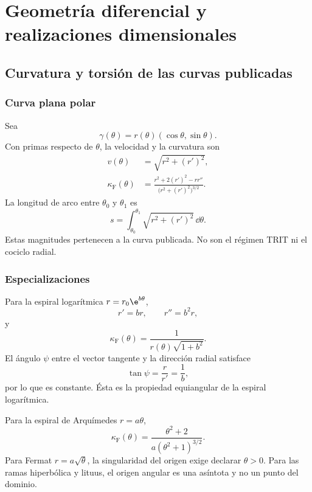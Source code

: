 \part{Geometría diferencial y realizaciones dimensionales}

\chapter{Curvatura y torsión de las curvas publicadas}

\section{Curva plana polar}

Sea
\[
 \gamma(\theta)=r(\theta)(\cos\theta,\sin\theta).
\]
Con primas respecto de \(\theta\), la velocidad y la curvatura son
\begin{align}
 v(\theta)&=\sqrt{r^2+(r')^2},\\
 \kappa_{\mathrm{F}}(\theta)&=
 \frac{r^2+2(r')^2-rr''}
 {\bigl(r^2+(r')^2\bigr)^{3/2}}.
 \label{espiral:eq:curvatura-polar}
\end{align}
La longitud de arco entre \(\theta_0\) y \(\theta_1\) es
\[
 s=\int_{\theta_0}^{\theta_1}
 \sqrt{r^2+(r')^2}\,\dd\theta.
\]
Estas magnitudes pertenecen a la curva publicada. No son el régimen TRIT ni
el cociclo radial.

\section{Especializaciones}

Para la espiral logarítmica \(r=r_0\e^{b\theta}\),
\[
 r'=br,\qquad r''=b^2r,
\]
y
\begin{equation}
 \kappa_{\mathrm{F}}(\theta)
 =\frac{1}{r(\theta)\sqrt{1+b^2}}.
 \label{espiral:eq:curvatura-log}
\end{equation}
El ángulo \(\psi\) entre el vector tangente y la dirección radial satisface
\[
 \tan\psi=\frac{r}{r'}=\frac1b,
\]
por lo que es constante. Ésta es la propiedad equiangular de la espiral
logarítmica.


Para la espiral de Arquímedes \(r=a\theta\),
\[
 \kappa_{\mathrm{F}}(\theta)
 =\frac{\theta^2+2}{a(\theta^2+1)^{3/2}}.
\]
Para Fermat \(r=a\sqrt\theta\), la singularidad del origen exige declarar
\(\theta>0\). Para las ramas hiperbólica y lituus, el origen angular es una
asíntota y no un punto del dominio.
